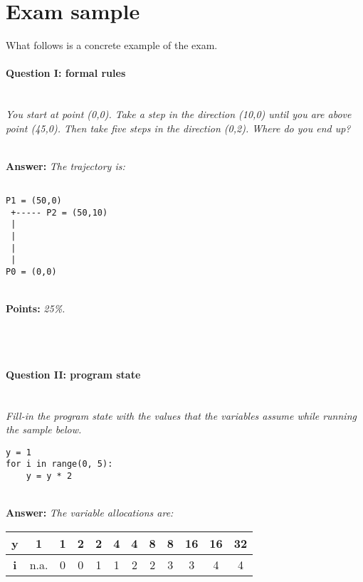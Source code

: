 \section*{Exam sample}
What follows is a concrete example of the exam.


\paragraph{Question I: formal rules} \ \\

\textit{You start at point (0,0). Take a step in the direction (10,0) until you are above point (45,0). Then take five steps in the direction (0,2). Where do you end up?}

\ \\ 

\textbf{Answer:} \textit{The trajectory is:}

\begin{lstlisting}

P1 = (50,0)
 +----- P2 = (50,10)
 |
 |
 |
 |
P0 = (0,0)
\end{lstlisting}

\ \\ 

\textbf{Points:} \textit{25\%.}

\ \\ 
\ \\ 

\paragraph{Question II: program state} \ \\ 

\textit{Fill-in the program state with the values that the variables assume while running the sample below.}

\begin{lstlisting}
y = 1
for i in range(0, 5):
    y = y * 2
\end{lstlisting}

\ \\ 

\textbf{Answer:} \textit{The variable allocations are:}

\begin{tabular}{| c | c | c | c | c | c | c | c | c | c | c | c |}
\hline
\textbf{y} & 1    & 1 & 2 & 2 & 4 & 4 & 8 & 8 & 16 & 16 & 32 \\
\hline
\textbf{i} & n.a. & 0 & 0 & 1 & 1 & 2 & 2 & 3 & 3  &  4 &  4 \\
\hline
\end{tabular}

